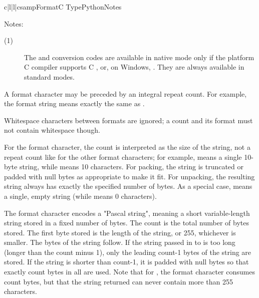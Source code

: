 \begin{tableiv}{c|l|l|c}{samp}{Format}{C Type}{Python}{Notes}
\end{tableiv}

\noindent
Notes:

\begin{description}
\item[(1)]
  The  and  conversion codes are available in
  native mode only if the platform C compiler supports C ,
  or, on Windows, .  They are always available in standard
  modes.
\end{description}


A format character may be preceded by an integral repeat count.  For
example, the format string  means exactly the same as
.

Whitespace characters between formats are ignored; a count and its
format must not contain whitespace though.

For the  format character, the count is interpreted as the
size of the string, not a repeat count like for the other format
characters; for example,  means a single 10-byte string, while
 means 10 characters.  For packing, the string is
truncated or padded with null bytes as appropriate to make it fit.
For unpacking, the resulting string always has exactly the specified
number of bytes.  As a special case,  means a single, empty
string (while  means 0 characters).

The  format character encodes a "Pascal string", meaning
a short variable-length string stored in a fixed number of bytes.
The count is the total number of bytes stored.  The first byte stored is
the length of the string, or 255, whichever is smaller.  The bytes
of the string follow.  If the string passed in to  is too
long (longer than the count minus 1), only the leading count-1 bytes of the
string are stored.  If the string is shorter than count-1, it is padded
with null bytes so that exactly count bytes in all are used.  Note that
for , the  format character consumes count
bytes, but that the string returned can never contain more than 255
characters.

